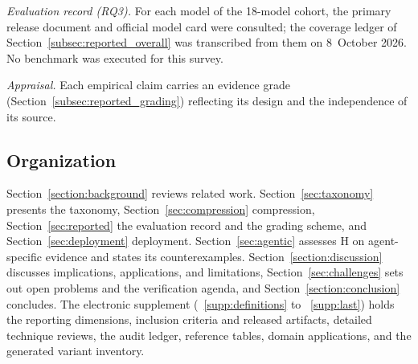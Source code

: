 \emph{Evaluation record (RQ3).} For each model of the 18-model cohort, the primary release document and official model card were consulted; the coverage ledger of Section~\ref{subsec:reported_overall} was transcribed from them on 8~October 2026. No benchmark was executed for this survey.

\emph{Appraisal.} Each empirical claim carries an evidence grade (Section~\ref{subsec:reported_grading}) reflecting its design and the independence of its source.
\label{subsubsec:intro_inclusion_summary}

\subsection{Organization}
\label{subsec:intro_organization}

Section~\ref{section:background} reviews related work. Section~\ref{sec:taxonomy} presents the taxonomy, Section~\ref{sec:compression} compression, Section~\ref{sec:reported} the evaluation record and the grading scheme, and Section~\ref{sec:deployment} deployment. Section~\ref{sec:agentic} assesses H on agent-specific evidence and states its counterexamples. Section~\ref{section:discussion} discusses implications, applications, and limitations, Section~\ref{sec:challenges} sets out open problems and the verification agenda, and Section~\ref{section:conclusion} concludes. The electronic supplement (\suppsec~\ref{supp:definitions} to \suppsec~\ref{supp:last}) holds the reporting dimensions, inclusion criteria and released artifacts, detailed technique reviews, the audit ledger, reference tables, domain applications, and the generated variant inventory.
